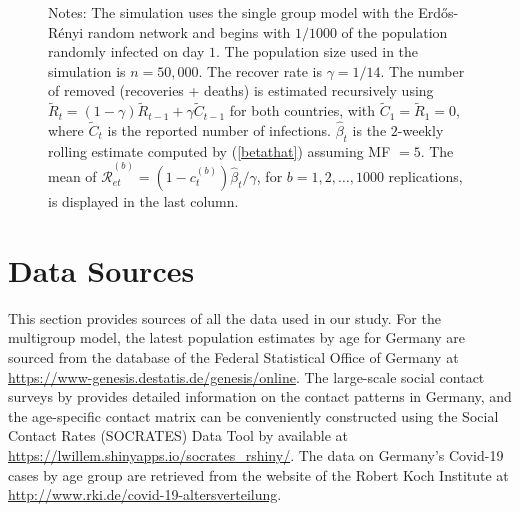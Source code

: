 \documentclass[12pt]{article}
\begin{document}
\begin{figure}[tbh]
\begin{center}
\end{center}

%

\vspace{-0.3cm}%
\footnotesize
{}Notes: The simulation uses the single group model with the
Erd\H{o}s-R\'{e}nyi random network and begins with $1/1000$ of the population
randomly infected on day $1$. The population size used in the simulation is
$n=50,000$. The recover rate is $\gamma=1/14$. The number of removed
(recoveries + deaths) is estimated recursively using $\tilde{R}_{t}=\left(
1-\gamma\right)  \tilde{R}_{t-1}+\gamma\tilde{C}_{t-1}$ for both countries,
with $\tilde{C}_{1}=\tilde{R}_{1}=0$, where $\tilde{C}_{t}$ is the reported
number of infections. $\hat{\beta}_{t}$ is the $2$-weekly rolling estimate
computed by (\ref{betathat}) assuming MF $=5$. The mean of $\mathcal{\hat{R}%
}_{et}^{(b)}=\left(  1-c_{t}^{(b)}\right)  \hat{\beta}_{t}/\gamma$, for
$b=1,2,\ldots,1000$ replications, is displayed in the last column.%

\end{figure}%


\section{Data Sources \label{Sup: data}}

This section provides sources of all the data used in our study. For the
multigroup model, the latest population estimates by age for Germany are
sourced from the database of the Federal Statistical Office of Germany at
\url{https://www-genesis.destatis.de/genesis/online}. The large-scale social
contact surveys by \cite{Mossong2008} provides detailed information on the
contact patterns in Germany, and the age-specific contact matrix can be
conveniently constructed using the Social Contact Rates (SOCRATES) Data Tool
by \cite{Willem2020socrates} available at
\url{https://lwillem.shinyapps.io/socrates_rshiny/}. The data on Germany's
Covid-19 cases by age group are retrieved from the website of the Robert Koch
Institute at \url{http://www.rki.de/covid-19-altersverteilung}.
\end{document}
